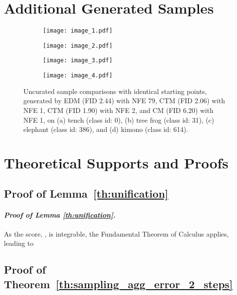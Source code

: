 \documentclass{article} \usepackage{iclr2024_coNFErence,times}
\newenvironment{myproof}[2]{\paragraph{\textit{Proof of {#1} {#2}. }}}{\hfill}
\theoremstyle{definition}
\theoremstyle{remark}
\begin{document}
\section{Additional Generated Samples}\label{sec:generated_samples}
\begin{figure}[t]\centering
	\begin{subfigure}{0.24\linewidth}
		\centering
		\texttt{[image: image\_1.pdf]}
	\end{subfigure}
	\begin{subfigure}{0.24\linewidth}
		\centering
		\texttt{[image: image\_2.pdf]}
	\end{subfigure}	
 	\begin{subfigure}{0.24\linewidth}
		\centering
		\texttt{[image: image\_3.pdf]}
	\end{subfigure}
  	\begin{subfigure}{0.24\linewidth}
		\centering
		\texttt{[image: image\_4.pdf]}
	\end{subfigure}
	\caption{Uncurated sample comparisons with identical starting points, generated by EDM (FID 2.44) with NFE 79, CTM (FID 2.06) with NFE 1, CTM (FID 1.90) with NFE 2, and CM (FID 6.20) with NFE 1, on (a) tench (class id: 0), (b) tree frog (class id: 31), (c) elephant (class id: 386), and (d) kimono (class id: 614).}
    \label{fig:image_results}
	 \vskip -0.1in
\end{figure}
\newpage
\clearpage
\section{Theoretical Supports and Proofs}\label{sec:proof}

\subsection{Proof of Lemma~\ref{th:unification}}
\begin{myproof}{Lemma}{\ref{th:unification}}
As the score, , is integrable, the Fundamental Theorem of Calculus applies, leading to

\end{myproof}

\subsection{Proof of Theorem~\ref{th:sampling_agg_error_2_steps}}
\end{document}
